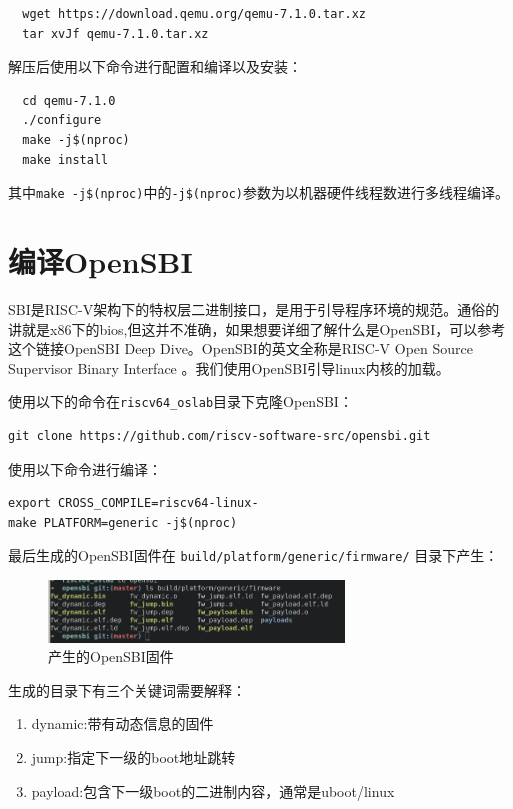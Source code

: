 \documentclass[lang=cn,10pt]{elegantbook}
\begin{document}
\begin{lstlisting}
  wget https://download.qemu.org/qemu-7.1.0.tar.xz
  tar xvJf qemu-7.1.0.tar.xz  
\end{lstlisting}

解压后使用以下命令进行配置和编译以及安装：

\begin{lstlisting}
  cd qemu-7.1.0
  ./configure
  make -j$(nproc)	
  make install
\end{lstlisting}

其中\lstinline{make -j$(nproc)}中的\lstinline{-j$(nproc)}参数为以机器硬件线程数进行多线程编译。

\section{编译OpenSBI}
SBI是RISC-V架构下的特权层二进制接口，是用于引导程序环境的规范。通俗的讲就是x86下的bios,但这并不准确，如果想要详细了解什么是OpenSBI，可以参考这个链接OpenSBI Deep Dive。OpenSBI的英文全称是RISC-V Open Source Supervisor Binary Interface 。我们使用OpenSBI引导linux内核的加载。

使用以下的命令在\lstinline{riscv64_oslab}目录下克隆OpenSBI：

\begin{lstlisting}
git clone https://github.com/riscv-software-src/opensbi.git
\end{lstlisting}

使用以下命令进行编译：

\begin{lstlisting}
export CROSS_COMPILE=riscv64-linux-
make PLATFORM=generic -j$(nproc)
\end{lstlisting}
	
最后生成的OpenSBI固件在 \lstinline{build/platform/generic/firmware/} 目录下产生：

\begin{figure}[htbp]
  \centering
  \includegraphics[width=0.7\textwidth]{image/image-20231105093844708.png}
  \caption{产生的OpenSBI固件}
\end{figure}


生成的目录下有三个关键词需要解释：

\begin{enumerate}
\item dynamic:带有动态信息的固件
\item jump:指定下一级的boot地址跳转
\item payload:包含下一级boot的二进制内容，通常是uboot/linux
\end{enumerate}
\end{document}
